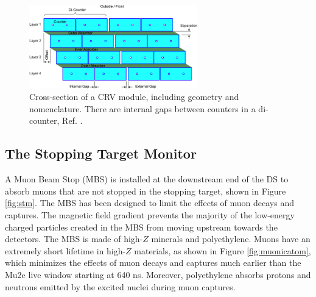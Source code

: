 \begin{figure}[!h]
\centering
\includegraphics[width =0.65\textwidth]{figures/png/Crv_module_geometry.png}
\caption{Cross-section of a CRV module, including geometry and nomenclature. 
There are internal gaps between counters in a di-counter, Ref. \cite{Giovannella_2020}.}
\label{fig:crvmodule}
\end{figure}
\subsection{The Stopping Target Monitor}
A Muon Beam Stop (MBS) is installed at the downstream end of the DS to 
absorb muons that are not stopped in the stopping target, shown in Figure \ref{fig:stm}. 
The MBS has been designed to limit the effects of muon decays and captures. 
The magnetic field gradient prevents the majority of the low-energy charged 
particles created in the MBS from moving upstream towards the detectors.  
The MBS is made of high-$Z$ minerals and polyethylene. Muons have an extremely short lifetime in 
high-$Z$ materials, as shown in Figure \ref{fig:muonicatom}, which minimizes the effects of muon 
decays and captures much earlier than the Mu2e live window starting at 640 ns. Moreover, polyethylene 
absorbs protons and neutrons emitted by the excited nuclei during muon captures.  

